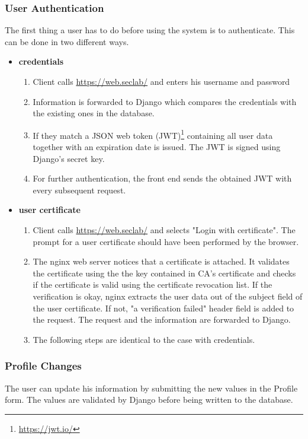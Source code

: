 \documentclass[english]{article}
\begin{document}
 \subsubsection{User Authentication}\label{login}
The first thing a user has to do before using the system is to authenticate. This can be done in two different ways.

\begin{itemize}
\item \textbf{credentials} 
\begin{enumerate}
\item Client calls \url{https://web.seclab/} and enters his username and password
\item Information is forwarded to Django which compares the credentials with the existing ones in the database.
\item If they match a JSON web token (JWT)\footnote{\url{https://jwt.io/}} containing all user data together with an expiration date is issued. The JWT is signed using Django's secret key. 
\item For further authentication, the front end sends the obtained JWT with every subsequent request.
\end{enumerate}
\item \textbf{user certificate}
\begin{enumerate}
\item Client calls \url{https://web.seclab/} and selects "Login with certificate". The prompt for a user certificate should have been performed by the browser. 
\item The nginx web server notices that a certificate is attached. It validates the certificate using the the key contained in CA's certificate and checks if the certificate is valid using the certificate revocation list. If the verification is okay, nginx extracts the user data out of the subject field of the user certificate. If not, "a verification failed" header field is added to the request. The request and the information are forwarded to Django.

\item The following steps are identical to the case with credentials.
\end{enumerate}
\end{itemize}

 \subsubsection{Profile Changes}\label{profile}
 The user can update his information by submitting the new values in the Profile form. The values are validated by Django before being written to the database.
 
\end{document}

